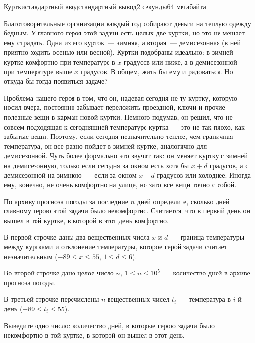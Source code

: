 \begin{problem}{Куртки}{стандартный ввод}{стандартный вывод}{2 секунды}{64 мегабайта}

Благотоворительные организации каждый год собирают деньги на теплую одежду бедным. У главного героя этой задачи есть целых две куртки, но это не мешает ему страдать. Одна из его курток~--- зимняя, а вторая~--- демисезонная (в ней приятно ходить осенью или весной). Куртки подобраны идеально: в зимней куртке комфортно при температуре в $x$ градусов или ниже, а в демисезонной -- при температуре выше $x$ градусов. В общем, жить бы ему и радоваться. Но откуда бы тогда появиться задаче?

Проблема нашего героя в том, что он, надевая сегодня не ту куртку, которую носил вчера, постоянно забывает переложить проездной, ключи и прочие полезные вещи в карман новой куртки. Немного подумав, он решил, что не совсем подходящая к сегодняшней температуре куртка~--- это не так плохо, как забытые вещи. Поэтому, если сегодня незначительно теплее, чем граничная температура, он все равно пойдет в зимней куртке, аналогично для демисезонной. Чуть более формально это звучит так: он меняет куртку с зимней на демисезонную, только если сегодня за окном есть хотя бы $x+d$ градусов, а с демисезонной на зимнюю~--- если за окном $x-d$ градусов или холоднее. Иногда ему, конечно, не очень комфортно на улице, но зато все вещи точно с собой.

По архиву прогноза погоды за последние $n$ дней определите, сколько дней главному герою этой задачи было некомфортно. Считается, что в первый день он вышел в той куртке, в которой в этот день комфортно.

\InputFile
В первой строчке даны два вещественных числа $x$ и $d$~--- граница температуры между куртками и отклонение температуры, которое герой задачи считает незначительным ($-89\leqslant x\leqslant 55$, $1 \leqslant d \leqslant 6$).

Во второй строчке дано целое число $n$, $1 \leqslant n \leqslant 10^5$~--- количество дней в архиве прогноза погоды.

В третьей строчке перечислены $n$ вещественных чисел $t_i$~--- температура в $i$-й день ($-89\leqslant t_i\leqslant 55$).

\OutputFile
Выведите одно число: количество дней, в которые герою задачи было некомфортно в той куртке, в которой он вышел в этот день.

\Examples

\begin{example}
%
%
\end{example}

\end{problem}
